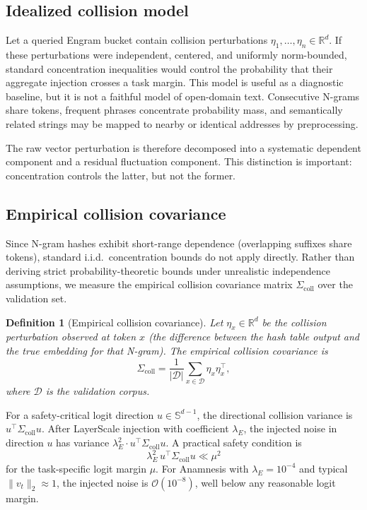\documentclass[preprint,12pt]{elsarticle}
\newtheorem{definition}[theorem]{Definition}
\begin{document}
\subsection{Idealized collision model}

Let a queried Engram bucket contain collision perturbations $\eta_1,\ldots,\eta_n\in\mathbb{R}^d$. If these perturbations were independent, centered, and uniformly norm-bounded, standard concentration inequalities would control the probability that their aggregate injection crosses a task margin. This model is useful as a diagnostic baseline, but it is not a faithful model of open-domain text. Consecutive N-grams share tokens, frequent phrases concentrate probability mass, and semantically related strings may be mapped to nearby or identical addresses by preprocessing.

The raw vector perturbation is therefore decomposed into a systematic dependent component and a residual fluctuation component. This distinction is important: concentration controls the latter, but not the former.

\subsection{Empirical collision covariance}

Since N-gram hashes exhibit short-range dependence (overlapping suffixes share tokens), standard i.i.d.\ concentration bounds do not apply directly. Rather than deriving strict probability-theoretic bounds under unrealistic independence assumptions, we measure the empirical collision covariance matrix $\Sigma_{\mathrm{coll}}$ over the validation set.

\begin{definition}[Empirical collision covariance]
Let $\eta_x \in \mathbb{R}^d$ be the collision perturbation observed at token $x$ (the difference between the hash table output and the true embedding for that N-gram). The empirical collision covariance is
\begin{equation}
\Sigma_{\mathrm{coll}} = \frac{1}{|\mathcal{D}|}\sum_{x \in \mathcal{D}} \eta_x \eta_x^\top,
\end{equation}
where $\mathcal{D}$ is the validation corpus.
\end{definition}

For a safety-critical logit direction $u \in \mathbb{S}^{d-1}$, the directional collision variance is $u^\top \Sigma_{\mathrm{coll}} u$. After LayerScale injection with coefficient $\lambda_E$, the injected noise in direction $u$ has variance $\lambda_E^2 \cdot u^\top \Sigma_{\mathrm{coll}} u$. A practical safety condition is
\begin{equation}
\lambda_E^2\,u^\top\Sigma_{\mathrm{coll}}u \ll \mu^2
\end{equation}
for the task-specific logit margin $\mu$. For Anamnesis with $\lambda_E = 10^{-4}$ and typical $\|v_t\|_2 \approx 1$, the injected noise is $\mathcal{O}(10^{-8})$, well below any reasonable logit margin.
\end{document}
